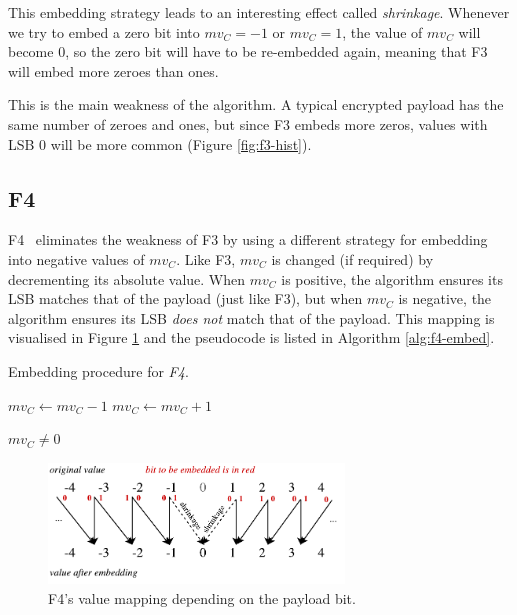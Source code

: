 \documentclass[12pt,british,twoside,notitlepage,usenames,dvipsnames,hypens,final]{report}
\numberwithin{equation}{section}
\numberwithin{figure}{section}
\begin{document}
This embedding strategy leads to an interesting effect called \emph{shrinkage}. Whenever we try to embed a zero bit into $mv_C = -1$ or $mv_C = 1$, the value of $mv_C$ will become 0, so the zero bit will have to be re-embedded again, meaning that F3 will embed more zeroes than ones. 

This is the main weakness of the algorithm. A typical encrypted payload has the same number of zeroes and ones, but since F3 embeds more zeros, values with LSB 0 will be more common (Figure \ref{fig:f3-hist}). 

\subsection{F4}
\label{f4}

F4~\cite{f5} eliminates the weakness of F3 by using a different strategy for embedding into negative values of $mv_C$. Like F3, $mv_C$ is changed (if required) by decrementing its absolute value. When $mv_C$ is positive, the algorithm ensures its LSB matches that of the payload (just like F3), but when $mv_C$ is negative, the algorithm ensures its LSB \emph{does not} match that of the payload. This mapping is visualised in Figure \ref{fig:f4-mapping} and the pseudocode is listed in Algorithm \ref{alg:f4-embed}.

\begin{algorithm}
\caption{Embedding procedure for \emph{F4}.}
\label{alg:f4-embed}
\begin{algorithmic}
    \State $mv_C \gets mv_C - 1$ 
\EndIf
{}
	\State $mv_C \gets mv_C + 1$ 
\EndIf

\State \Return $mv_C \neq 0$
\EndProcedure
\end{algorithmic}
\end{algorithm}

\begin{figure}[tbh]
\centering
\includegraphics[width=0.7\textwidth]{img/movest_f4_mapping.pdf}
\caption{F4's value mapping depending on the payload bit.}
\label{fig:f4-mapping}
\end{figure}
\end{document}
